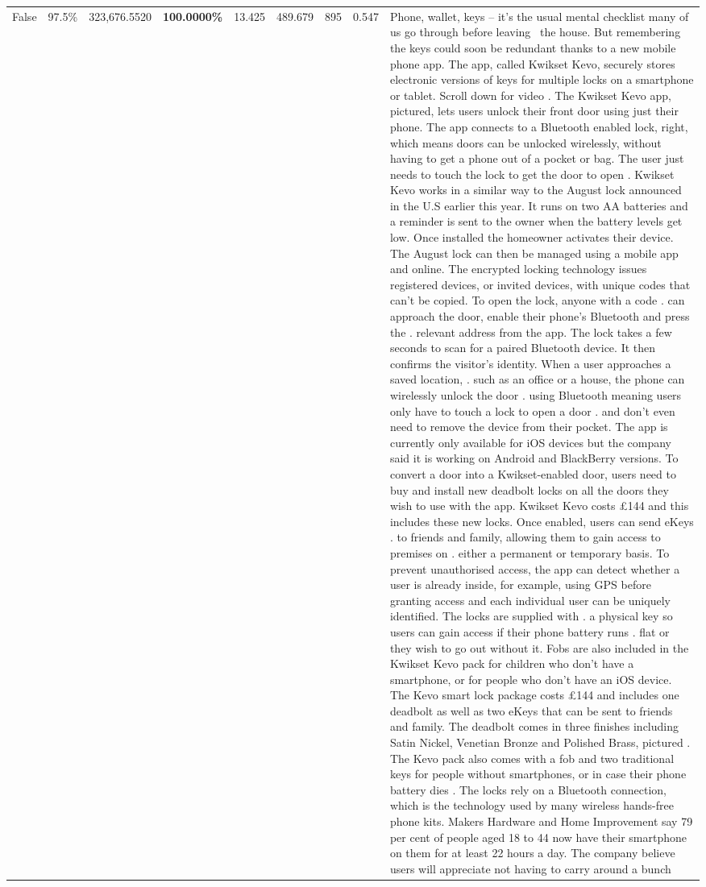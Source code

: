 \begin{table}[H]
\begin{tabular}{lllrlllll}
False & 97.5\% & 323,676.5520 & \bfseries \color{red} 100.0000\% & 13.425 & 489.679 & 895 & 0.547 & Phone, wallet, keys – it’s the usual mental checklist many of us go through before leaving  the house. But remembering the keys could soon be redundant thanks to a new mobile phone app. The app, called Kwikset Kevo, securely stores electronic versions of keys for multiple locks on a smartphone or tablet. Scroll down for video . The Kwikset Kevo app, pictured, lets users unlock their front door using just their phone. The app connects to a Bluetooth enabled lock, right, which means doors can be unlocked wirelessly, without having to get a phone out of a pocket or bag. The user just needs to touch the lock to get the door to open . Kwikset Kevo works in a similar way to the August lock announced in the U.S earlier this year. It runs on two AA batteries and a reminder is sent to the owner when the battery levels get low. Once installed the homeowner activates their device. The August lock can then be managed using a mobile app and online. The encrypted locking technology issues registered devices, or invited devices, with unique codes that can't be copied. To open the lock, anyone with a code . can approach the door, enable their phone's Bluetooth and press the . relevant address from the app. The lock takes a few seconds to scan for a paired Bluetooth device. It then confirms the visitor's identity. When a user approaches a saved location, . such as an office or a house, the phone can wirelessly unlock the door . using Bluetooth meaning users only have to touch a lock to open a door . and don't even need to remove the device from their pocket. The app is currently only available for iOS devices but the company said it is working on Android and BlackBerry versions. To convert a door into a Kwikset-enabled door, users need to buy and install new deadbolt locks on all the doors they wish to use with the app. Kwikset Kevo costs £144 and this includes these new locks. Once enabled, users can send eKeys . to friends and family, allowing them to gain access to premises on . either a permanent or temporary basis. To prevent unauthorised access, the app can detect whether a user is already inside, for example, using GPS before granting access and each individual user can be uniquely identified. The locks are supplied with . a physical key so users can gain access if their phone battery runs . flat or they wish to go out without it. Fobs are also included in the Kwikset Kevo pack for children who don't have a smartphone, or for people who don't have an iOS device. The Kevo smart lock package costs £144 and includes one deadbolt as well as two eKeys that can be sent to friends and family. The deadbolt comes in three finishes including Satin Nickel, Venetian Bronze and Polished Brass, pictured . The Kevo pack also comes with a fob and two traditional keys for people without smartphones, or in case their phone battery dies . The locks rely on a Bluetooth connection, which is the technology used by many wireless hands-free phone kits. Makers Hardware and Home Improvement say 79 per cent of people aged 18 to 44 now have their smartphone on them for at least 22 hours a day. The company believe users will appreciate not having to carry around a bunch 
\end{tabular}
\end{table}
